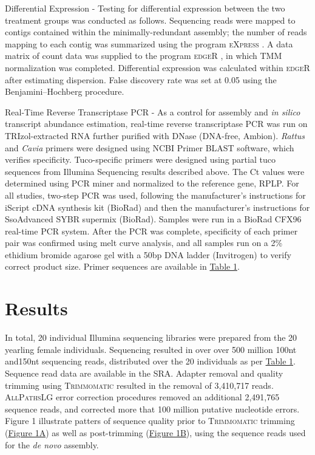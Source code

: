 \documentclass[10.5pt]{article}
\begin{document}
Differential Expression -  Testing for differential expression between the two treatment groups was conducted as follows. Sequencing reads were mapped to contigs contained within the minimally-redundant assembly; the number of reads mapping to each contig was summarized using the program \textsc{eXpress} \cite{Roberts:2012dh}. A data matrix of count data was supplied to the program \textsc{edgeR} \citep{Robinson:2010cw}, in which TMM normalization was completed.  Differential expression was calculated within \textsc{edgeR} after estimating dispersion.  False discovery rate was set at 0.05 using the Benjamini--Hochberg procedure. 

Real-Time Reverse Transcriptase PCR - As a control for assembly and \textit{in silico} transcript abundance estimation, real-time reverse transcriptase PCR was run on TRIzol-extracted RNA further purified with DNase (DNA-free, Ambion). \textit{Rattus} and \textit{Cavia} primers were designed using NCBI Primer BLAST software, which verifies specificity. Tuco-specific primers were designed using partial tuco sequences from Illumina Sequencing results described above. The Ct values were determined using PCR miner \citep{Zhao:2005ku} and normalized to the reference gene, RPLP. For all studies, two-step PCR was used, following the manufacturer’s instructions for iScript cDNA synthesis kit (BioRad) and then the manufacturer’s instructions for SsoAdvanced SYBR supermix (BioRad). Samples were run in a BioRad CFX96 real-time PCR system. After the PCR was complete, specificity of each primer pair was confirmed using melt curve analysis, and all samples run on a 2\% ethidium bromide agarose gel with a 50bp DNA ladder (Invitrogen) to verify correct product size. Primer sequences are available in \hyperlink{Table 1}{Table 1}.

\section*{Results}
\hspace{4mm} In total, 20 individual Illumina sequencing libraries were prepared from the 20 yearling female individuals. Sequencing resulted in over over 500 million 100nt and150nt sequencing reads, distributed over the 20 individuals as per \hyperlink{Table 1}{Table 1}. Sequence read data are available in the SRA. Adapter removal and quality trimming using \textsc{Trimmomatic} resulted in the removal of 3,410,717 reads. \textsc{AllPathsLG} error correction procedures removed an additional 2,491,765 sequence reads, and corrected more that 100 million putative nucleotide errors. Figure 1 illustrate patters of sequence quality prior to \textsc{Trimmomatic} trimming (\hyperlink{Figure 1}{Figure 1A}) as well as post-trimming (\hyperlink{Figure 1}{Figure 1B}), using the sequence reads used for the \textit{de novo} assembly. 
\end{document}
